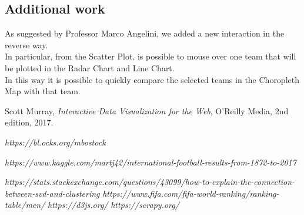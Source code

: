 \documentclass[journal]{vgtc}                %
\begin{document}
\subsection{Additional work}
As suggested by Professor Marco Angelini, we added a new interaction in the reverse way. \\
In particular, from the Scatter Plot, is possible to mouse over  one team that will be plotted in the Radar Chart and Line Chart.\\
In this way it is possible to quickly compare the selected teams in the Choropleth Map with that team.
\begin{thebibliography}{9}

  Scott Murray,
  \textit{Interactive Data Visualization for the Web},
  O'Reilly Media,
  2nd edition,
  2017.
  
  \textit{ https://bl.ocks.org/mbostock} 

  \textit{https://www.kaggle.com/martj42/international-football-results-from-1872-to-2017} 

  \textit{https://stats.stackexchange.com/questions/43099/how-to-explain-the-connection-between-svd-and-clustering}
\textit{https://www.fifa.com/fifa-world-ranking/ranking-table/men/}
  \textit{https://d3js.org/}
\textit{https://scrapy.org/}



\end{thebibliography}
\end{document}
